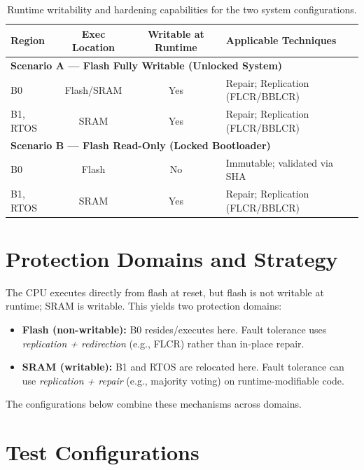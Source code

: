 \begin{table}[h!]
  \centering
  \renewcommand{\arraystretch}{1.15}
  \begin{tabularx}{\linewidth}{|l|c|c|X|}
    \hline
    \textbf{Region} & \textbf{Exec Location} & \textbf{Writable at Runtime} & \textbf{Applicable Techniques} \\ \hline
    \multicolumn{4}{|l|}{\textbf{Scenario A — Flash Fully Writable (Unlocked System)}} \\ \hline
    B0        & Flash/SRAM & Yes & Repair; Replication (FLCR/BBLCR) \\ \hline
    B1, RTOS  & SRAM       & Yes & Repair; Replication (FLCR/BBLCR) \\ \hline
    \multicolumn{4}{|l|}{\textbf{Scenario B — Flash Read-Only (Locked Bootloader)}} \\ \hline
    B0        & Flash & No  & Immutable; validated via SHA \\ \hline
    B1, RTOS  & SRAM  & Yes & Repair; Replication (FLCR/BBLCR) \\ \hline
  \end{tabularx}
  \caption{Runtime writability and hardening capabilities for the two system configurations.}
  \label{tab:system-access-configs}
\end{table}


\section{Protection Domains and Strategy}
\label{sec:protection-domains}

The CPU executes directly from flash at reset, but flash is not writable at runtime; SRAM is writable. This yields two protection domains:
\begin{itemize}
  \item \textbf{Flash (non-writable):} B0 resides/executes here. Fault tolerance uses \emph{replication + redirection} (e.g., FLCR) rather than in-place repair.
  \item \textbf{SRAM (writable):} B1 and RTOS are relocated here. Fault tolerance can use \emph{replication + repair} (e.g., majority voting) on runtime-modifiable code.
\end{itemize}
The configurations below combine these mechanisms across domains.

\section{Test Configurations}
\label{sec:test-configs}


